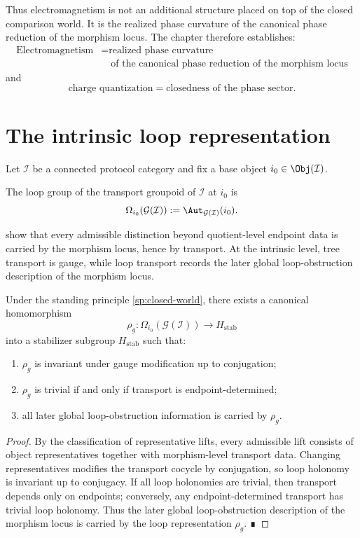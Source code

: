 Thus electromagnetism is not an additional structure placed on top of
the closed comparison world.
It is the realized phase curvature of the canonical phase reduction of
the morphism locus.
\medskip
The chapter therefore establishes:
\[
	\boxed{
		\begin{aligned}
			\text{Electromagnetism}
				&=
			\text{realized phase curvature}
			\\
				&\quad
			\text{of the canonical phase reduction of the morphism locus}
		\end{aligned}
	}
\]
and
\[
	\boxed{
		\text{charge quantization}=
		\text{closedness of the phase sector}.
	}
\]
\section{The intrinsic loop representation}
\label{sec:em-loop-representation}
Let \(\mathcal I\) be a connected protocol category and fix a base object
\(i_0\in\Obj(\mathcal I)\).
\begin{definition}
	The loop group of the transport groupoid of \(\mathcal I\) at \(i_0\) is
	\[
		\Omega_{i_0}(\mathcal G(\mathcal I)):=\Aut_{\mathcal G(\mathcal I)}(i_0).
	\]
\end{definition}
 show that every
admissible
distinction beyond quotient-level endpoint data is carried by the
morphism locus, hence by transport.
At the intrinsic level, tree transport is gauge, while loop transport
records the later global loop-obstruction description of the morphism
locus.
\begin{theorem}
	Under the standing principle \cref{sp:closed-world}, there exists a
	canonical homomorphism
	\[
		\rho_g:\Omega_{i_0}(\mathcal G(\mathcal I))\longrightarrow H_{\mathrm{stab}}
	\]
	into a stabilizer subgroup \(H_{\mathrm{stab}}\) such that:
	\begin{enumerate}
		\item
		      \(\rho_g\) is invariant under gauge modification up to conjugation;
		\item
		      \(\rho_g\) is trivial if and only if transport is endpoint-determined;
		\item
		      all later global loop-obstruction information is carried by
		      \(\rho_g\).
	\end{enumerate}
\end{theorem}
\begin{proof}
	By the classification of representative lifts, every admissible lift
	consists of object representatives together with morphism-level
	transport data.
	Changing representatives modifies the transport cocycle by conjugation,
	so loop holonomy is invariant up to conjugacy.
	If all loop holonomies are trivial, then transport depends only on
	endpoints; conversely, any endpoint-determined transport has trivial
	loop holonomy.
	Thus the later global loop-obstruction description of the morphism
	locus is carried by the loop representation \(\rho_g\). ∎
\end{proof}
